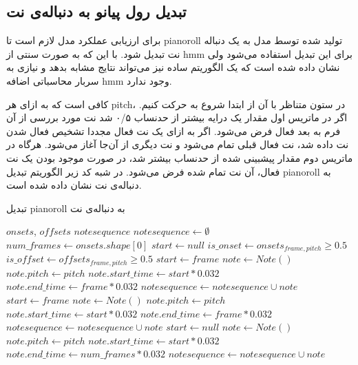 \subsection{تبدیل رول پیانو به دنباله‌ی نت}
برای ارزیابی عملکرد مدل لازم است تا \gls{pianoroll} تولید شده توسط مدل به یک
دنباله نت تبدیل شود. با این که به صورت سنتی از \gls{hmm} برای این تبدیل استفاده
می‌شود ولی نشان داده شده است که یک الگوریتم ساده نیز می‌تواند نتایج مشابه بدهد و
نیازی به سربار محاسباتی اضافه \gls{hmm} وجود ندارد.

کافی است که به ازای هر \gls{pitch}، در ستون متناظر با آن از ابتدا شروع به حرکت
کنیم. اگر در ماتریس اول مقدار یک درایه بیشتر از حدنساب ۰/۵ شد نت مورد بررسی از
آن فرم به بعد فعال فرض می‌شود. اگر به ازای یک نت فعال مجددا تشخیص فعال شدن نت
داده شد، نت فعال قبلی تمام می‌شود و نت دیگری از آن‌جا آغاز می‌شود. هرگاه در
ماتریس دوم مقدار پیشبینی شده از حدنساب بیشتر شد، در صورت موجود بودن یک نت فعال،
آن نت تمام شده فرض می‌شود. در شبه کد زیر الگوریتم تبدیل \gls{pianoroll} به
دنباله‌ی نت نشان داده شده است.
\begin{algorithm}[ht]
\caption{تبدیل \gls{pianoroll} به دنباله‌ی نت}
\begin{algorithmic}
\begin{latin}
    \Require $onsets$, $offsets$
    \Ensure $notesequence$
    \State $notesequence \leftarrow \emptyset$
    \State $num\_frames \leftarrow onsets.shape[0]$
        \State $start \leftarrow null$
            \State $is\_onset \leftarrow onsets_{frame, pitch} \geq 0.5$
            \State $is\_offset \leftarrow offsets_{frame, pitch} \geq 0.5$
                \State $start \leftarrow frame$
                \State $note \leftarrow Note()$
                \State $note.pitch \leftarrow pitch$
                \State $note.start\_time \leftarrow start * 0.032$
                \State $note.end\_time \leftarrow frame * 0.032$
                \State $notesequence \leftarrow notesequence \cup note$
                \State $start \leftarrow frame$
                \State $note \leftarrow Note()$
                \State $note.pitch \leftarrow pitch$
                \State $note.start\_time \leftarrow start * 0.032$
                \State $note.end\_time \leftarrow frame * 0.032$
                \State $notesequence \leftarrow notesequence \cup note$
                \State $start \leftarrow null$
            \EndIf
        \EndFor
            \State $note \leftarrow Note()$
            \State $note.pitch \leftarrow pitch$
            \State $note.start\_time \leftarrow start * 0.032$
            \State $note.end\_time \leftarrow num\_frames * 0.032$
            \State $notesequence \leftarrow notesequence \cup note$
        \EndIf
    \EndFor
\end{latin}
\end{algorithmic}
\end{algorithm}

